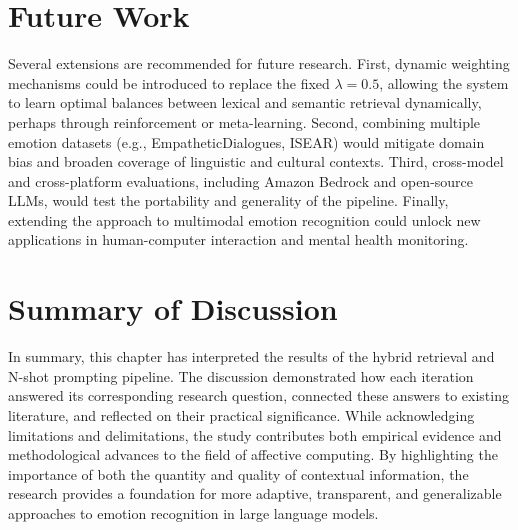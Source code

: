 \section{Future Work}
Several extensions are recommended for future research. First, dynamic weighting mechanisms could be introduced to replace the fixed $\lambda=0.5$, allowing the system to learn optimal balances between lexical and semantic retrieval dynamically, perhaps through reinforcement or meta-learning. Second, combining multiple emotion datasets (e.g., EmpatheticDialogues, ISEAR) would mitigate domain bias and broaden coverage of linguistic and cultural contexts. Third, cross-model and cross-platform evaluations, including Amazon Bedrock and open-source LLMs, would test the portability and generality of the pipeline. Finally, extending the approach to multimodal emotion recognition could unlock new applications in human-computer interaction and mental health monitoring.

\section{Summary of Discussion}
In summary, this chapter has interpreted the results of the hybrid retrieval and N-shot prompting pipeline. The discussion demonstrated how each iteration answered its corresponding research question, connected these answers to existing literature, and reflected on their practical significance. While acknowledging limitations and delimitations, the study contributes both empirical evidence and methodological advances to the field of affective computing. By highlighting the importance of both the quantity and quality of contextual information, the research provides a foundation for more adaptive, transparent, and generalizable approaches to emotion recognition in large language models.
